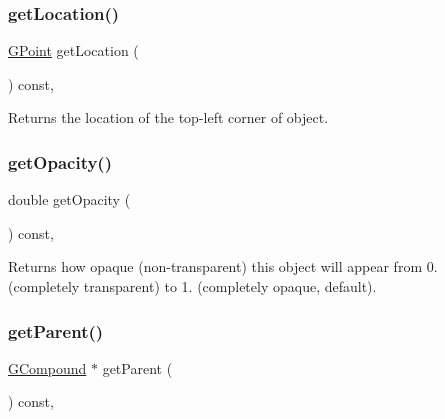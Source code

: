 \subsubsection{\texorpdfstring{get\+Location()}{getLocation()}}
{\footnotesize\ttfamily \mbox{\hyperlink{structsgl_1_1GPoint}{G\+Point}} get\+Location (\begin{DoxyParamCaption}{ }\end{DoxyParamCaption}) const\hspace{0.3cm}{\ttfamily [virtual]}, {\ttfamily [inherited]}}



Returns the location of the top-\/left corner of object. 

\mbox{\label{classsgl_1_1GObject_a1ae3fc278cc5b71b9f2d96a8a83cdf26}} 
\subsubsection{\texorpdfstring{get\+Opacity()}{getOpacity()}}
{\footnotesize\ttfamily double get\+Opacity (\begin{DoxyParamCaption}{ }\end{DoxyParamCaption}) const\hspace{0.3cm}{\ttfamily [virtual]}, {\ttfamily [inherited]}}



Returns how opaque (non-\/transparent) this object will appear from 0. (completely transparent) to 1. (completely opaque, default). 

\mbox{\label{classsgl_1_1GObject_a3e53cef70541b1a14eade4ad0984d0b4}} 
\subsubsection{\texorpdfstring{get\+Parent()}{getParent()}}
{\footnotesize\ttfamily \mbox{\hyperlink{classsgl_1_1GCompound}{G\+Compound}} $\ast$ get\+Parent (\begin{DoxyParamCaption}{ }\end{DoxyParamCaption}) const\hspace{0.3cm}{\ttfamily [virtual]}, {\ttfamily [inherited]}}



